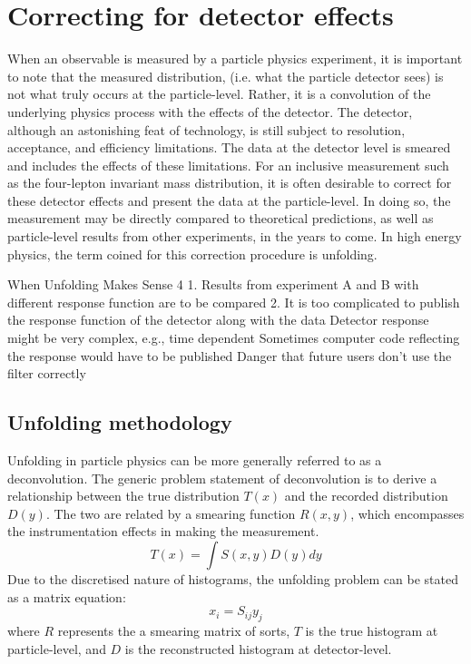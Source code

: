 \section{Correcting for detector effects}
\label{sec:unfolding}

When an observable is measured by a particle physics experiment, it is important to note that the measured distribution, (i.e. what the particle detector sees) is not what truly occurs at the particle-level. Rather, it is a convolution of the underlying physics process with the effects of the detector. The \ATLAS detector, although an astonishing feat of technology, is still subject to resolution, acceptance, and efficiency limitations. The data at the detector level is smeared and includes the effects of these limitations. For an inclusive measurement such as the four-lepton invariant mass distribution, it is often desirable to correct for these detector effects and present the data at the particle-level. In doing so, the measurement may be directly compared to theoretical predictions, as well as particle-level results from other experiments, in the years to come. In high energy physics, the term coined for this correction procedure is unfolding.

When Unfolding Makes Sense
4
1. Results from experiment A and B with different response function are to be
compared
2. It is too complicated to publish the response function of the detector along
with the data
Detector response might be very complex, e.g., time dependent
Sometimes computer code reflecting the response would have to be published
Danger that future users don't use the filter correctly

\subsection{Unfolding methodology}
\label{subsec:unfmethod}

Unfolding in particle physics can be more generally referred to as a deconvolution. The generic problem statement of deconvolution is to derive a relationship between the true distribution $T(x)$ and the recorded distribution $D(y)$. The two are related by a smearing function $R(x,y)$, which encompasses the instrumentation effects in making the measurement. 
\begin{equation} \label{eq:unfintegral}
    T(x)=\int S(x,y)D(y)dy
\end{equation}
Due to the discretised nature of histograms, the unfolding problem can be stated as a matrix equation:
\begin{equation} \label{eq:unfmatrix}
    x_i=S_{ij}y_j
\end{equation}
where $R$ represents the a smearing matrix of sorts, $T$ is the true histogram at particle-level, and $D$ is the reconstructed histogram at detector-level. 

